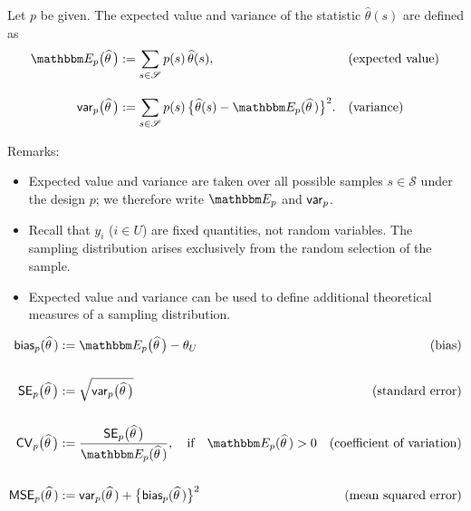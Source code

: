 \documentclass{my_eth_beamer}
\numberwithin{equation}{section}
\begin{document}
\begin{frame}
    \begin{Def}\label{def:expectation}
        \vspace{-0.5em}
        Let $p$ be given. The \alert{expected value} and \alert{variance}
        of the statistic $\widehat{\theta}(s)$ are defined as
        \begin{align*}
            \EE\big(\widehat{\theta}\,\big) & := \sum_{s \in \samplespace} p(s)
                \, \widehat{\theta}(s), && (\text{expected value}) \\[1em]
            \var\big(\widehat{\theta}\,\big) & := \sum_{s \in \samplespace}
                p(s) \, \big\{\widehat{\theta}(s) -
                \EE(\widehat{\theta}\,)\big\}^2. && (\text{variance})
        \end{align*}
    \end{Def}
    \vspace{0.25em}
    Remarks:
    \vspace{0.25em}
    \begin{itemize}
    \setlength{\itemsep}{6pt}
        \item Expected value and variance are taken \alert{over all possible
            samples} $s \in \mathscr S$ under the design $p$; we therefore
            write $\EE$ and $\mathsf{var}_p$.
        \item Recall that $y_i$ ($i \in U$) are fixed quantities, not random
            variables. The sampling distribution arises \alert{exclusively}
            from the random selection of the sample.
    \end{itemize}
\end{frame}

\begin{frame}
    \begin{itemize}
    \setlength{\itemsep}{8pt}
        \item Expected value and variance can be used to define
            \alert{additional theoretical measures} of a sampling
            distribution.
    \end{itemize}
    \begin{align*}
        \bias(\widehat{\theta}\,) & := \EE\big(\widehat{\theta}\,\big) -
            \theta_U & \text{(bias)}\\[1.5em]
        \se\big(\widehat{\theta}\,\big) & :=
            \sqrt{\var\big(\widehat{\theta}\,\big)} &
            \text{(standard error)}\\[1.5em]
       \varcoef\big(\widehat{\theta}\,\big) & :=
            \frac{\se\big(\widehat{\theta}\,\big)}{\EE(\widehat{\theta}\,)},
            \quad \text{if} \quad \EE(\widehat{\theta}\,) > 0 &
            \text{(coefficient of variation)}\\[1.5em]
        \MSE(\widehat{\theta}\,) & := \var(\widehat{\theta}\,) +
            \big\{\bias(\widehat{\theta}\,)\big\}^2 &
            \text{(mean squared error)}
    \end{align*}
\end{frame}
\end{document}
